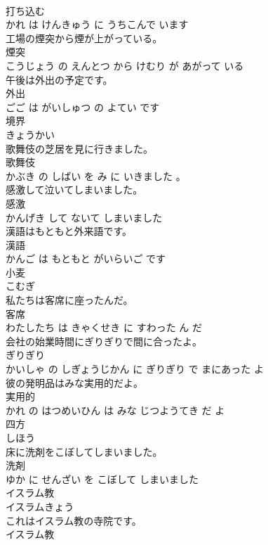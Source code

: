 \documentclass[8pt]{extreport}
\begin{document}
\begin{CJK}{UTF8}{min}
\\	打ち込む 
\\	かれ は けんきゅう に うちこんで います			
\\	工場の煙突から煙が上がっている。	
\\	煙突 
\\	こうじょう の えんとつ から けむり が あがって いる			
\\	午後は外出の予定です。	
\\	外出 
\\	ごご は がいしゅつ の よてい です			
\\	境界	
\\	きょうかい		
\\	歌舞伎の芝居を見に行きました。	
\\	歌舞伎 
\\	かぶき の しばい を み に いきました 。			
\\	感激して泣いてしまいました。	
\\	感激 
\\	かんげき して ないて しまいました			
\\	漢語はもともと外来語です。	
\\	漢語 
\\	かんご は もともと がいらいご です			
\\	小麦	
\\	こむぎ		
\\	私たちは客席に座ったんだ。	
\\	客席 
\\	わたしたち は きゃくせき に すわった ん だ			
\\	会社の始業時間にぎりぎりで間に合ったよ。	
\\	ぎりぎり 
\\	かいしゃ の しぎょうじかん に ぎりぎり で まにあった よ			
\\	彼の発明品はみな実用的だよ。	
\\	実用的 
\\	かれ の はつめいひん は みな じつようてき だ よ			
\\	四方	
\\	しほう		
\\	床に洗剤をこぼしてしまいました。	
\\	洗剤 
\\	ゆか に せんざい を こぼして しまいました			
\\	イスラム教	
\\	イスラムきょう			
\\	これはイスラム教の寺院です。	
\\	イスラム教 

\end{CJK}
\end{document}
